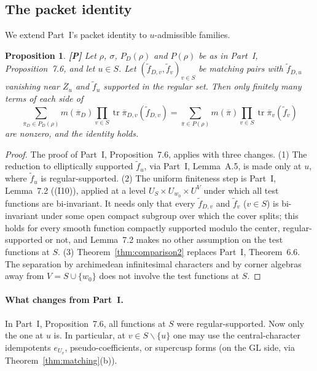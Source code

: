 \documentclass[12pt]{article}
\newcommand{\ov}[1]{\overline{#1}}
\newcommand{\tr}{\operatorname{tr}}
\newcommand{\GL}{\mathrm{GL}}
\newcommand{\Zb}{\ov{Z}}
\newcommand{\pib}{\ov{\pi}}
\newcommand{\Pv}{\textbf{[P]}}
\theoremstyle{plain}
\newtheorem{proposition}[theorem]{Proposition}
\theoremstyle{definition}
\begin{document}
\subsection{The packet identity}\label{subsec:packet2}
We extend Part~I's packet identity to $u$-admissible families.

\begin{proposition}\label{prop:packet2}\Pv
Let $\rho$, $\sigma$, $P_D(\rho)$ and $P(\rho)$ be as in Part~I, Proposition~7.6, and let $u\in S$. Let $(\tilde f_{D,v},\tilde f_v)_{v\in S}$ be matching pairs with $\tilde f_{D,u}$ vanishing near $\Zb_u$ and $\tilde f_u$ supported in the regular set. Then only finitely many terms of each side of
\begin{equation}\label{eq:packet2}
\sum_{\pib_D\in P_D(\rho)}m(\pib_D)\prod_{v\in S}\tr\pib_{D,v}(\tilde f_{D,v})=\sum_{\pib\in P(\rho)}m(\pib)\prod_{v\in S}\tr\pib_v(\tilde f_v)
\end{equation}
are nonzero, and the identity holds.
\end{proposition}
\begin{proof}
The proof of Part~I, Proposition~7.6, applies with three changes. (1) The reduction to elliptically supported $\tilde f_u$, via Part~I, Lemma~A.5, is made only at $u$, where $\tilde f_u$ is regular-supported. (2) The uniform finiteness step is Part~I, Lemma~7.2 ((I10)), applied at a level $U_S\times U_{w_0}\times U^V$ under which all test functions are bi-invariant. It needs only that every $\tilde f_{D,v}$ and $\tilde f_v$ ($v\in S$) is bi-invariant under some open compact subgroup over which the cover splits; this holds for every smooth function compactly supported modulo the center, regular-supported or not, and Lemma~7.2 makes no other assumption on the test functions at $S$. (3) Theorem~\ref{thm:comparison2} replaces Part~I, Theorem~6.6. The separation by archimedean infinitesimal characters and by corner algebras away from $V=S\cup\{w_0\}$ does not involve the test functions at $S$.
\end{proof}

\paragraph{What changes from Part~I.} In Part~I, Proposition~7.6, all functions at $S$ were regular-supported. Now only the one at $u$ is. In particular, at $v\in S\smallsetminus\{u\}$ one may use the central-character idempotents $e_{U_v}$, pseudo-coefficients, or supercusp forms (on the $\GL$ side, via Theorem~\ref{thm:matching}(b)).
\end{document}
